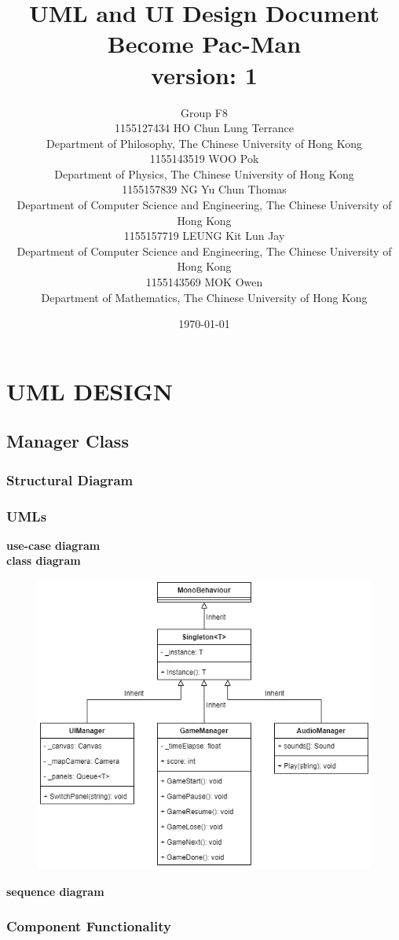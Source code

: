 \documentclass[11pt]{article}
\title{UML and UI Design Document\\Become Pac-Man\\version: 1}
\author{Group F8\\1155127434 HO Chun Lung Terrance\\
Department of Philosophy, The Chinese University of Hong Kong\\1155143519 WOO Pok\\
Department of Physics, The Chinese University of Hong Kong\\1155157839 NG Yu Chun Thomas\\
Department of Computer Science and Engineering, The Chinese University of Hong Kong\\1155157719 LEUNG Kit Lun Jay\\
Department of Computer Science and Engineering, The Chinese University of Hong Kong\\1155143569 MOK Owen\\
Department of Mathematics, The Chinese University of Hong Kong}
\date{\today}
\begin{document}
\maketitle
\tableofcontents
\newpage
\section{UML DESIGN}

\subsection{Manager Class}
\subsubsection{Structural Diagram}
\subsubsection{UMLs}
\textbf{use-case diagram}\\
\textbf{class diagram}\\
\begin{figure}[H]
    \centering
    \includegraphics*[scale=0.4]{UML-Class-Singleton.png}
\end{figure}
\textbf{sequence diagram}\\
\subsubsection{Component Functionality}
\end{document}
